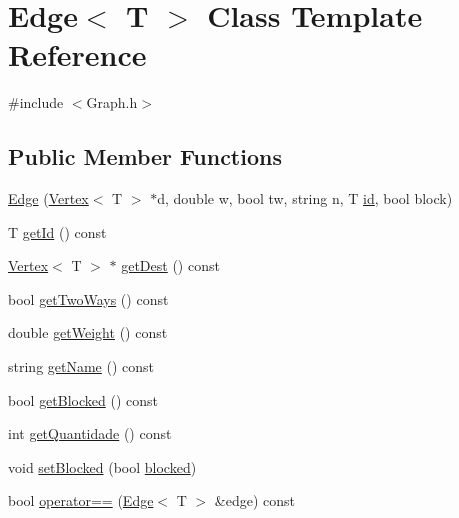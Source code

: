 \hypertarget{class_edge}{}\section{Edge$<$ T $>$ Class Template Reference}
\label{class_edge}


{\ttfamily \#include $<$Graph.\+h$>$}

\subsection*{Public Member Functions}
\begin{DoxyCompactItemize}
\item 
\mbox{\hyperlink{class_edge_af91ae535825f84ebca33b11859350442}{Edge}} (\mbox{\hyperlink{class_vertex}{Vertex}}$<$ T $>$ $\ast$d, double w, bool tw, string n, T \mbox{\hyperlink{class_edge_af64ff5794c079dcb6af0986cd404185c}{id}}, bool block)
\item 
T \mbox{\hyperlink{class_edge_a494c97c4dec2e84810729834485f5863}{get\+Id}} () const
\item 
\mbox{\hyperlink{class_vertex}{Vertex}}$<$ T $>$ $\ast$ \mbox{\hyperlink{class_edge_a9a2de066dff8513dd788d553fc1d0c81}{get\+Dest}} () const
\item 
bool \mbox{\hyperlink{class_edge_a1c0292bb11664877045b0c679c1eb0db}{get\+Two\+Ways}} () const
\item 
double \mbox{\hyperlink{class_edge_a3df378e283d6c8be5be4170ac8d7f4e8}{get\+Weight}} () const
\item 
string \mbox{\hyperlink{class_edge_ac983418ce88a0c00eb86064e7731f075}{get\+Name}} () const
\item 
bool \mbox{\hyperlink{class_edge_a6ba277f64f4a588ba116d4609408fbff}{get\+Blocked}} () const
\item 
int \mbox{\hyperlink{class_edge_acbd28aa046af584e2ff2667ea726b56a}{get\+Quantidade}} () const
\item 
void \mbox{\hyperlink{class_edge_ad16b09e81bcfeed46393c11eb4bb7681}{set\+Blocked}} (bool \mbox{\hyperlink{class_edge_ad6ef308f0a89198b588a98055b8edc33}{blocked}})
\item 
bool \mbox{\hyperlink{class_edge_a419d424a457e1689cc8a2ec1abf39efa}{operator==}} (\mbox{\hyperlink{class_edge}{Edge}}$<$ T $>$ \&edge) const
\end{DoxyCompactItemize}

